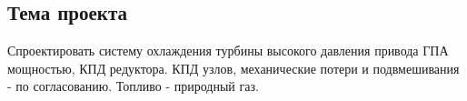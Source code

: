 \subsection{Тема проекта}

Спроектировать систему охлаждения турбины высокого давления привода ГПА мощностью, КПД редуктора. КПД узлов, механические потери
и подвмешивания - по согласованию. Топливо - природный газ.
